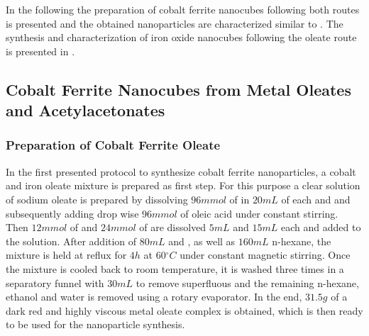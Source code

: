 \documentclass[\main/dresen_thesis.tex]{subfiles}
\begin{document}
  In the following the preparation of cobalt ferrite nanocubes following both routes is presented and the obtained nanoparticles are characterized similar to .
  The synthesis and characterization of iron oxide nanocubes following the oleate route is presented in .

  \subsection{Cobalt Ferrite Nanocubes from Metal Oleates and Acetylacetonates}
    \subsubsection{Preparation of Cobalt Ferrite Oleate}
      In the first presented protocol to synthesize cobalt ferrite nanoparticles, a cobalt and iron oleate mixture is prepared as first step.
      For this purpose a clear solution of sodium oleate is prepared by dissolving $96 \unit{mmol}$ of  in $20 \unit{mL}$ of each  and  and subsequently adding drop wise $96 \unit{mmol}$ of oleic acid under constant stirring.
      Then $12 \unit{mmol}$ of  and $24 \unit{mmol}$ of  are dissolved $5 \unit{mL}$  and $15 \unit{mL}$  each and added to the solution.
      After addition of $80 \unit{mL}$  and , as well as $160 \unit{mL}$ n-hexane, the mixture is held at reflux for $4 \unit{h}$ at $60 \unit{^\circ C}$ under constant magnetic stirring.
      Once the mixture is cooled back to room temperature, it is washed three times in a separatory funnel with $30 \unit{mL}$  to remove superfluous  and the remaining n-hexane, ethanol and water is removed using a rotary evaporator.
      In the end, $31.5 \unit{g}$ of a dark red and highly viscous metal oleate complex is obtained, which is then ready to be used for the nanoparticle synthesis.
\end{document}
